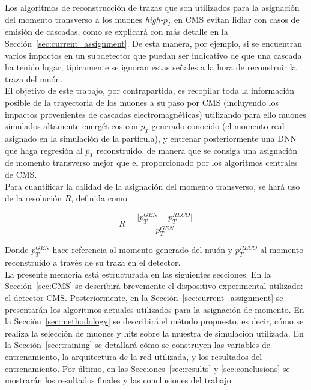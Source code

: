 Los algoritmos de reconstrucci\'on de trazas que son utilizados para la asignaci\'on del momento transverso a los muones \textit{high-$p_{T}$} en CMS evitan lidiar con casos de emisi\'on de cascadas, como se explicar\'a con m\'as detalle en la Secci\'on~\ref{sec:current_assignment}. De esta manera, por ejemplo, si se encuentran varios impactos en un subdetector que puedan ser indicativo de que una cascada ha tenido lugar, t\'ipicamente se ignoran estas se\~nales a la hora de reconstruir la traza del mu\'on. \\
El objetivo de este trabajo, por contrapartida, es recopilar toda la informaci\'on posible de la trayectoria de los muones a su paso por CMS (incluyendo los impactos provenientes de cascadas electromagn\'eticas) utilizando para ello muones simulados altamente energ\'eticos con $p_{T}$ generado conocido (el momento real asignado en la simulaci\'on de la partícula), y entrenar posteriormente una DNN que haga regresi\'on al $p_{T}$ reconstruido, de manera que se consiga una asignaci\'on de momento transverso mejor que el proporcionado por los algoritmos centrales de CMS. \\

Para cuantificar la calidad de la asignaci\'on del momento transverso, se har\'a uso de la resoluci\'on $R$, definida como:

\begin{equation}
  R = \dfrac{\lvert p_{T}^{GEN} - p_{T}^{RECO}\rvert}{p_{T}^{GEN}}
\label{eq:R}
\end{equation}

Donde $p_{T}^{GEN}$ hace referencia al momento generado del mu\'on y $p_{T}^{RECO}$ al momento reconstruido a trav\'es de su traza en el detector. \\

La presente memoria est\'a estructurada en las siguientes secciones. En la Secci\'on~\ref{sec:CMS} se describir\'a brevemente el dispositivo experimental utilizado: el detector CMS. Posteriormente, en la Secci\'on~\ref{sec:current_assignment} se presentar\'an los algoritmos actuales utilizados para la asignaci\'on de momento. En la Secci\'on~\ref{sec:methodology} se describir\'a el m\'etodo propuesto, es decir, c\'omo se realiza la selecci\'on de muones y hits sobre la muestra de simulaci\'on utilizada. En la Secci\'on~\ref{sec:training} se detallar\'a c\'omo se construyen las variables de entrenamiento, la arquitectura de la red utilizada, y los resultados del entrenamiento. Por \'ultimo, en las Secciones~\ref{sec:results} y \ref{sec:conclusions} se mostrar\'an los resultados finales y las conclusiones del trabajo.
